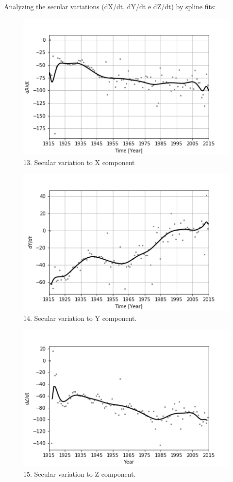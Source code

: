 \documentclass[final,t]{beamer}
\begin{document}
\begin{columns}[t]
\begin{column}{.25\linewidth}
\begin{block}{}
	Analyzing the secular variations (dX/dt, dY/dt e dZ/dt) by spline fits: 		
	\begin{figure}
		\centering
		\includegraphics[width=0.8\linewidth]{spline101sv_X_spline}
		\caption{13. Secular variation to X component}
		\label{SPLINEx}
	\end{figure}
	
	\begin{figure}
		\centering
		\includegraphics[width=0.8\linewidth]{spline100sv_y_spline}
		\caption{14. Secular variation to Y component.}
		\label{SPLINEy}
	\end{figure}
	
	\begin{figure}
		\centering
		\includegraphics[width=0.8\linewidth]{spline100sv_z_spline}
		\caption{15. Secular variation to Z component.}
		\label{Splinez}
	\end{figure}


\end{block}
\end{column}
\end{columns}
\end{document}
